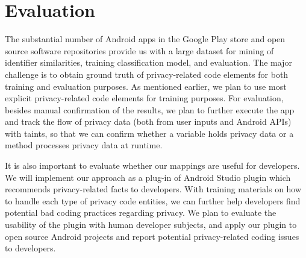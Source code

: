 \section{Evaluation}

The substantial number of Android apps in the Google Play store and open source software repositories provide us with a large dataset for mining of identifier similarities, training classification model, and evaluation. The major challenge is to obtain ground truth of privacy-related code elements for both training and evaluation purposes. As mentioned earlier, we plan to use most explicit privacy-related code elements for training purposes. For evaluation, besides manual confirmation of the results, we plan to further execute the app and track the flow of privacy data (both from user inputs and Android APIs) with taints, so that we can confirm whether a variable holds privacy data or a method processes privacy data at runtime.

It is also important to evaluate whether our mappings are useful for developers. We will implement our approach as a plug-in of Android Studio plugin which recommends privacy-related facts to developers. With training materials on how to handle each type of privacy code entities, we can further help developers find potential bad coding practices regarding privacy. We plan to evaluate the usability of the plugin with human developer subjects, and apply our plugin to open source Android projects and report potential privacy-related coding issues to developers.
